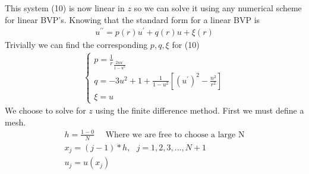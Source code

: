 \documentclass{article}
\begin{document}
\begin{enumerate}
This system (10) is now linear in $z$ so we can solve it using any numerical scheme for linear BVP's. Knowing that the standard form for a linear BVP is
\begin{align}
u^{\prime\prime} = p(r)u^\prime + q(r)u + \xi (r)
\end{align}
Trivially we can find the corresponding $p,q,\xi$ for (10)
\begin{align*}
\begin{cases}
p = \frac{1}{r} _ \frac{2uu^\prime}{1-u^2} \\
q = -3u^2 + 1 + \frac{1}{1-u^2}\left[(u^\prime)^2 -\frac{n^2}{r^2} \right] \\
\xi = u
\end{cases}
\end{align*}
We choose to solve for $z$ using the finite difference method. First we must define a mesh.
\begin{align}
h = \frac{1-0}{N} \ \ \ \ \ \ \text{Where we are free to choose a large N} \\
x_j = (j-1)*h, \ \ \ j = 1,2,3,...,N+1 \\
u_j = u(x_j)
\end{align}
 

\end{enumerate}
\end{document}
